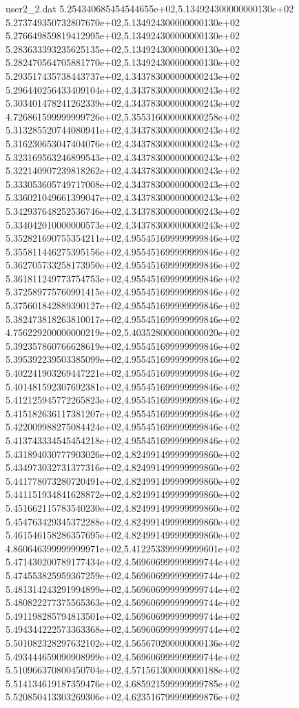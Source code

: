 \begin{filecontents}{user2_2.dat}
5.254340685454544655e+02,5.134924300000000130e+02
5.273749350732807670e+02,5.134924300000000130e+02
5.276649859819412995e+02,5.134924300000000130e+02
5.283633393235625135e+02,5.134924300000000130e+02
5.282470564705881770e+02,5.134924300000000130e+02
5.293517435738443737e+02,4.343783000000000243e+02
5.296440256433409104e+02,4.343783000000000243e+02
5.303401478241262339e+02,4.343783000000000243e+02
4.726861599999999726e+02,5.355316000000000258e+02
5.313285520744080941e+02,4.343783000000000243e+02
5.316230653047404076e+02,4.343783000000000243e+02
5.323169563246899543e+02,4.343783000000000243e+02
5.322140907239818262e+02,4.343783000000000243e+02
5.333053605749717008e+02,4.343783000000000243e+02
5.336021049661399047e+02,4.343783000000000243e+02
5.342937648252536746e+02,4.343783000000000243e+02
5.334042010000000573e+02,4.343783000000000243e+02
5.352821690755354211e+02,4.955451699999999846e+02
5.355811446275395156e+02,4.955451699999999846e+02
5.362705733258173950e+02,4.955451699999999846e+02
5.361811249773754753e+02,4.955451699999999846e+02
5.372589775760991415e+02,4.955451699999999846e+02
5.375601842889390127e+02,4.955451699999999846e+02
5.382473818263810017e+02,4.955451699999999846e+02
4.756229200000000219e+02,5.403528000000000020e+02
5.392357860766628619e+02,4.955451699999999846e+02
5.395392239503385099e+02,4.955451699999999846e+02
5.402241903269447221e+02,4.955451699999999846e+02
5.401481592307692381e+02,4.955451699999999846e+02
5.412125945772265823e+02,4.955451699999999846e+02
5.415182636117381207e+02,4.955451699999999846e+02
5.422009988275084424e+02,4.955451699999999846e+02
5.413743334545454218e+02,4.955451699999999846e+02
5.431894030777903026e+02,4.824991499999999860e+02
5.434973032731377316e+02,4.824991499999999860e+02
5.441778073280720491e+02,4.824991499999999860e+02
5.441151934841628872e+02,4.824991499999999860e+02
5.451662115783540230e+02,4.824991499999999860e+02
5.454763429345372288e+02,4.824991499999999860e+02
5.461546158286357695e+02,4.824991499999999860e+02
4.860646399999999971e+02,5.412253399999999601e+02
5.471430200789177434e+02,4.569606999999999744e+02
5.474553825959367259e+02,4.569606999999999744e+02
5.481314243291994899e+02,4.569606999999999744e+02
5.480822277375565363e+02,4.569606999999999744e+02
5.491198285794813501e+02,4.569606999999999744e+02
5.494344222573363368e+02,4.569606999999999744e+02
5.501082328297632102e+02,4.565670200000000136e+02
5.493444659090908999e+02,4.569606999999999744e+02
5.510966370800450704e+02,4.571561300000000188e+02
5.514134619187359476e+02,4.685921599999999785e+02
5.520850413303269306e+02,4.623516799999999876e+02

\end{filecontents}
